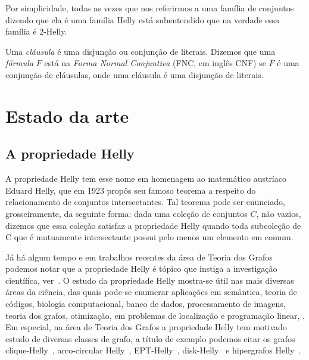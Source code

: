 Por simplicidade, todas as vezes que nos referirmos a uma família de conjuntos dizendo que ela é uma família Helly está subentendido que na verdade essa família é $2$-Helly. %

Uma \emph{cláusula} é uma disjunção ou conjunção de literais. Dizemos que uma \emph{fórmula} $F$ está na \emph{Forma Normal Conjuntiva} (FNC, em inglês CNF) se $F$ é uma conjunção de cláusulas, onde uma cláusula é uma disjunção de literais.

\section{Estado da arte}

\subsection{A propriedade Helly}

A propriedade Helly tem esse nome em homenagem ao matemático austríaco Eduard Helly, que em 1923 propôs seu famoso teorema a respeito do relacionamento de conjuntos intersectantes. Tal teorema pode ser enunciado, grosseiramente, da seguinte forma: dada uma coleção de conjuntos $C$, não vazios, dizemos que essa coleção satisfaz a propriedade Helly quando toda subcoleção de C que é mutuamente intersectante possui pelo menos um elemento em comum. %

Já há algum tempo e em trabalhos recentes da área de Teoria dos Grafos podemos notar que a propriedade Helly é tópico que instiga a investigação científica, %
ver~\cite{berge1973,bergeDuchet1975,golumbic2013, teles2016,jose2018}.
O estudo da propriedade Helly mostra-se útil nas mais diversas áreas da ciência, das quais  pode-se enumerar aplicações em  semântica, teoria de códigos, biologia computacional, banco de dados, processamento de imagens, teoria dos grafos, otimização, em problemas de localização e programação linear, \cite{teles2016}. Em especial, na área de Teoria dos Grafos a propriedade Helly tem motivado estudo de  diversas classes de grafo, a título de exemplo podemos citar os grafos clique-Helly~\cite{DOURADO2008}, arco-circular Helly~\cite{safe2016essential}, EPT-Helly~\cite{alcon2017helly}, disk-Helly~\cite{lin2007faster} e hipergrafos Helly~\cite{mulder1979median}.

